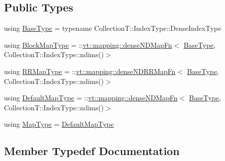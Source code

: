 \subsection*{Public Types}
\begin{DoxyCompactItemize}
\item 
using \hyperlink{structvt_1_1vrt_1_1collection_1_1_default_map_a953b7df01a204bd36169ec241b88cc77}{Base\+Type} = typename Collection\+T\+::\+Index\+Type\+::\+Dense\+Index\+Type
\item 
using \hyperlink{structvt_1_1vrt_1_1collection_1_1_default_map_a0784870e9ab02d89e2b9abe6ea539bbe}{Block\+Map\+Type} = \+::\hyperlink{namespacevt_1_1mapping_a02a4066fb2101421d657a9f601cc9977}{vt\+::mapping\+::dense\+N\+D\+Map\+Fn}$<$ \hyperlink{structvt_1_1vrt_1_1collection_1_1_default_map_base_a171c2e994a586fa5d8e1213f7ebfda95}{Base\+Type}, Collection\+T\+::\+Index\+Type\+::ndims()$>$
\item 
using \hyperlink{structvt_1_1vrt_1_1collection_1_1_default_map_a4afb5c3182bf77563e5fe5226801522b}{R\+R\+Map\+Type} = \+::\hyperlink{namespacevt_1_1mapping_af7eabd4006a3462a6ae120d52cc638a1}{vt\+::mapping\+::dense\+N\+D\+R\+R\+Map\+Fn}$<$ \hyperlink{structvt_1_1vrt_1_1collection_1_1_default_map_base_a171c2e994a586fa5d8e1213f7ebfda95}{Base\+Type}, Collection\+T\+::\+Index\+Type\+::ndims()$>$
\item 
using \hyperlink{structvt_1_1vrt_1_1collection_1_1_default_map_abec6478a6996d20fe301da1dfc1e232e}{Default\+Map\+Type} = \+::\hyperlink{namespacevt_1_1mapping_a02a4066fb2101421d657a9f601cc9977}{vt\+::mapping\+::dense\+N\+D\+Map\+Fn}$<$ \hyperlink{structvt_1_1vrt_1_1collection_1_1_default_map_base_a171c2e994a586fa5d8e1213f7ebfda95}{Base\+Type}, Collection\+T\+::\+Index\+Type\+::ndims()$>$
\item 
using \hyperlink{structvt_1_1vrt_1_1collection_1_1_default_map_aaff2b46b7ef2a1cb012fbddd6e123c32}{Map\+Type} = \hyperlink{structvt_1_1vrt_1_1collection_1_1_default_map_abec6478a6996d20fe301da1dfc1e232e}{Default\+Map\+Type}
\end{DoxyCompactItemize}


\subsection{Member Typedef Documentation}
\mbox{\label{structvt_1_1vrt_1_1collection_1_1_default_map_a953b7df01a204bd36169ec241b88cc77}} 
